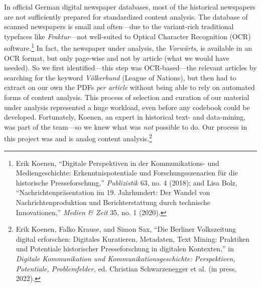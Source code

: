 \documentclass{tufte-handout}
\begin{document}
In official German digital newspaper databases, most of the historical
newspapers are not sufficiently prepared for standardized content
analysis. The database of scanned newspapers is small and often---due to
the variant-rich traditional typefaces like \emph{Fraktur}---not
well-suited to Optical Character Recognition (OCR) software.\footnote{Erik
  Koenen, ``Digitale Perspektiven in der Kommunikations- und
  Mediengeschichte: Erkenntnispotentiale und Forschungsszenarien für die
  historische Presseforschung,'' \emph{Publizistik} 63, no. 4 (2018);
  and Lisa Bolz, ``Nachrichtenpräsentation im 19. Jahrhundert: Der
  Wandel von Nachrichtenproduktion und Berichterstattung durch
  technische Innovationen,'' \emph{Medien \& Zeit} 35, no. 1 (2020).} In
fact, the newspaper under analysis, the \emph{Vorwärts,} is available in
an OCR format, but only page-wise and not by article (what we would have
needed). So we first identified---this step was OCR-based---the relevant
articles by searching for the keyword \emph{Völkerbund} (League of
Nations), but then had to extract on our own the PDFs \emph{per article}
without being able to rely on automated forms of content analysis. This
process of selection and curation of our material under analysis
represented a huge workload, even before any codebook could be
developed. Fortunately, Koenen, an expert in historical text- and
data-mining, was part of the team---so we knew what was \emph{not}
possible to do. Our process in this project was and is analog content
analysis.\footnote{Erik Koenen, Falko Krause, and Simon Sax, ``Die
  Berliner Volkszeitung digital erforschen: Digitales Kuratieren,
  Metadaten, Text Mining: Praktiken und Potentiale historischer
  Presseforschung in digitalen Kontexten,'' in \emph{Digitale
  Kommunikation und Kommunikationsgeschichte: Perspektiven, Potentiale,
  Problemfelder,} ed. Christian Schwarzenegger et al. (in press, 2022).}
\end{document}
